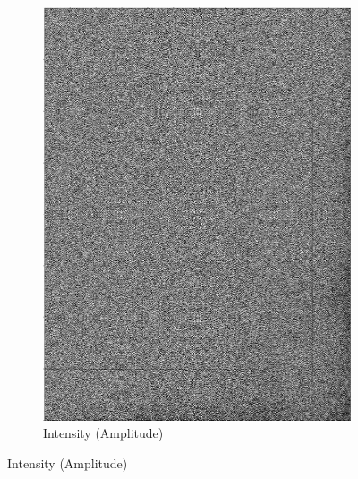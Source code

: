 \documentclass[landscape,a0paper,fontscale=0.5]{baposter} %
\begin{document}
\begin{poster}
{\begin{figure}[H]
\begin{subfigure}{0.2\textwidth}
		\includegraphics[scale=0.115]{4Pattern.jpg}
		\caption{Intensity (Amplitude)} %
	\end{subfigure}
\end{figure}
\vspace{-3em}
\begin{figure}[H]
	\centering
	\begin{subfigure}{0.2\textwidth} %

\end{subfigure}
\end{figure}}
\end{poster}
\end{document}
